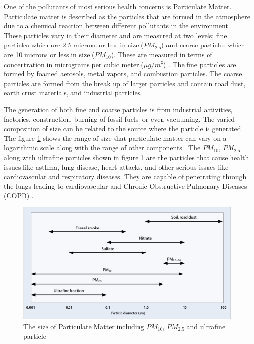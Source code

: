 One of the pollutants of most serious health concerns is Particulate Matter. Particulate matter is described as the particles that are formed in the atmosphere due to a chemical reaction between different pollutants in the environment \cite{manisalidis2020environmental}. These particles vary in their diameter and are measured at two levels; fine particles which are 2.5 microns or less in size ($PM_{2.5}$) and coarse particles which are 10 microns or less in size ($PM_{10}$). These are measured in terms of concentration in micrograms per cubic meter ($\mu g/m^3$) \cite{Wilson1997}. The fine particles are formed by foamed aerosols, metal vapors, and combustion particles. The coarse particles are formed from the break up of larger particles and contain road dust, earth crust materials, and industrial particles. 



The generation of both fine and coarse particles is from industrial activities, factories, construction, burning of fossil fuels, or even vacuuming. The varied composition of size can be related to the source where the particle is generated. The figure \ref{PMSIZE} shows the range of size that particulate matter can vary on a logarithmic scale along with the range of other components  \cite{world2006air}. The $PM_{10}$, $PM_{2.5}$ along with ultrafine particles shown in figure \ref{PMSIZE} are the particles that cause health issues like asthma, lung disease, heart attacks, and other serious issues like cardiovascular and respiratory diseases. They are capable of penetrating through the lungs leading to cardiovascular and Chronic Obstructive Pulmonary Diseases (COPD) \cite{Tian2016}. 





\hspace{1 cm}

\begin{figure}[h!]
  \begin{center}
  \includegraphics[scale=0.93]{./images/figure37.png}
  \end{center}
 
  \caption{The size of Particulate Matter including $PM_{10}$, $PM_{2.5}$ and ultrafine particle \cite{world2006air}}
  
  \label{PMSIZE}
\end{figure}
\hspace{1 cm}

